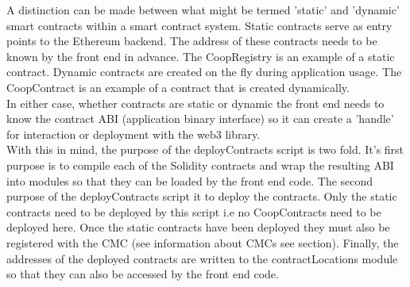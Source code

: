 A distinction can be made between what might be termed 'static' and 'dynamic' smart contracts within a smart contract system. Static contracts serve as entry points to the Ethereum backend. The address of these contracts needs to be known by the front end in advance. The CoopRegistry is an example of a static contract. Dynamic contracts are created on the fly during application usage. The CoopContract is an example of a contract that is created dynamically. \\

In either case, whether contracts are static or dynamic the front end needs to know the contract ABI (application binary interface) so it can create a 'handle' for interaction or deployment with the web3 library.\\

With this in mind, the purpose of the deployContracts script is two fold. It's first purpose is to compile each of the Solidity contracts and wrap the resulting ABI into modules so that they can be loaded by the front end code. The second purpose of the deployContracts script it to deploy the contracts. Only the static contracts need to be deployed by this script i.e no CoopContracts need to be deployed here. Once the static contracts have been deployed they must also be registered with the CMC (see information about CMCs see section). Finally, the addresses of the deployed contracts are written to the contractLocations module so that they can also be accessed by the front end code. \\


